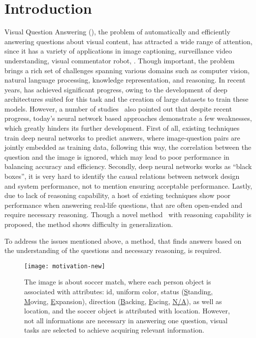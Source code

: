 \section{Introduction}
\label{sec-intro}


Visual Question Answering (\vqa), the
problem of automatically and efficiently answering questions about visual content, has attracted a wide range of attention, since it has a variety of applications in \eg image captioning, surveillance video understanding, visual commentator robot, \etc. 
Though important, the \vqa problem brings a rich set of challenges spanning various domains such as computer vision, natural language processing, knowledge representation, and reasoning. 
In recent years, \vqa has achieved significant
progress, owing to the development of deep architectures suited for this task and the creation of large \vqa datasets to train these models. 
However, a number of studies~\cite{peixi2019,Goyal_2017} also pointed out that despite recent progress, today's neural network based approaches demonstrate a few weaknesses, which greatly hinders its further development. First of all, existing techniques train deep neural networks to predict answers, where image-question pairs are jointly embedded as training data, following this way, the correlation between the question and the image is ignored, which may lead to poor performance in balancing accuracy and efficiency. Secondly, deep neural networks works as ``black boxes'', it is very hard to identify the causal relations between network design and system performance, not to mention ensuring acceptable performance. Lastly, due to lack of reasoning capability, a host of existing techniques show poor performance when answering real-life questions, that are often open-ended and require necessary reasoning. Though a novel method~\cite{peixi2019} with reasoning capability is proposed, the method shows difficulty in generalization.  

To address the issues mentioned above, a method, that finds answers based on the understanding of the questions and necessary reasoning, is required. 


\begin{figure}[tb]
\centering
\texttt{[image: motivation-new]}
\caption{The image is about soccer match, where each person object is associated with attributes: id, uniform color, status (\underline{S}tanding, \underline{M}oving, \underline{E}xpansion), direction (\underline{B}acking, \underline{F}acing, \underline{N/A}), as well as location, and the soccer object is attributed with location. However, not all informations are necessary in answering one question, visual tasks are selected to achieve acquiring relevant information.%
}
\vspace{-4ex}
\label{fig:example}
\end{figure}

